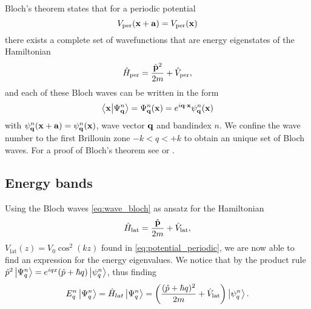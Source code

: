 Bloch's theorem states that for a periodic potential
\begin{equation}
  V_\text{per}(\vb{x}+\vb{a})=V_\text{per}(\vb{x})
  \label{eq:potential_periodic}
\end{equation}
there exists a complete set of wavefunctions that are energy eigenstates
of the Hamiltonian
\begin{equation}
  \hat{H}_\text{per}
  =\frac{\hat{\vb{p}}^2}{2m}+\hat{V}_\text{per}
  \label{eq:hamiltonian_periodic},
\end{equation}
and each of these Bloch waves can be written in the form
\begin{equation}
  \bra{\vb{x}}\ket{\Psi^n_{\vb{q}}}
  =\Psi^n_{\vb{q}}(\vb{x})
  =e^{i\vb{q}\cdot\vb{x}}\psi^n_{\vb{q}}(\vb{x})
  \label{eq:wave_bloch}
\end{equation}
with $\psi^n_{\vb{q}}(\vb{x}+\vb{a})=\psi^n_{\vb{q}}(\vb{x})$, wave vector
$\vb{q}$ and bandindex $n$. We confine the wave number to the first Brillouin
zone $-k<q<+k$ to obtain an unique set of Bloch waves. For a proof of Bloch's
theorem see \cite{Roessler2004} or \cite{Bartelmann2018}.

\subsection{Energy bands}

Using the Bloch waves \cref{eq:wave_bloch} as ansatz for the Hamiltonian
\begin{equation}
  \hat{H}_\text{lat}
  =\frac{\hat{\vb{p}}}{2m}+\hat{V}_\text{lat}
  \label{eq:hamiltonian_lattice},
\end{equation}
$V_\text{lat}(z)=V_0\cos^2(kz)$ found in \cref{eq:potential_periodic}, we are
now able to find an expression for the energy eigenvalues. We notice that by
the product rule
$\hat{p}^2\ket{\Psi^n_{q}}=e^{iqx}(\hat{p}+\hbar q)\ket{\psi^n_{q}}$,
thus finding
\begin{equation}
  E^n_q\ket{\Psi^n_{q}}
  =\hat{H}_{lat}\ket{\Psi^n_{q}}
  =\left(\frac{(\hat{p}+\hbar q)^2}{2m}+\hat{V}_\text{lat}\right)\ket{\psi^n_{q}}
  \label{eq:eigenvalue_energy_lattice}.
\end{equation}

